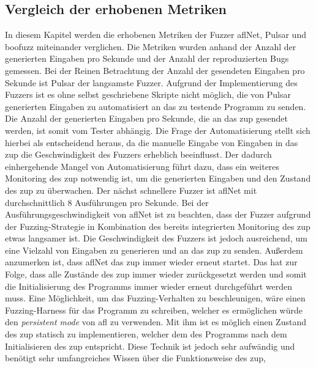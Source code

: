 \subsection{Vergleich der erhobenen Metriken}\label{subsec:vergleich-der-erhobenen-metriken}
In diesem Kapitel werden die erhobenen Metriken der Fuzzer \gls{afl}Net, Pulsar und boofuzz miteinander verglichen.
Die Metriken wurden anhand der Anzahl der generierten Eingaben pro Sekunde und der Anzahl der reproduzierten Bugs gemessen.\newline\newline
Bei der Reinen Betrachtung der Anzahl der gesendeten Eingaben pro Sekunde ist Pulsar der langsamste Fuzzer.
Aufgrund der Implementierung des Fuzzers ist es ohne selbst geschriebene Skripte nicht möglich, die von Pulsar generierten
Eingaben zu automatisiert an das zu testende Programm zu senden.
Die Anzahl der generierten Eingaben pro Sekunde, die an das \gls{zup} gesendet werden, ist somit vom Tester abhängig.
Die Frage der Automatisierung stellt sich hierbei als entscheidend heraus, da die manuelle Eingabe von Eingaben in das
\gls{zup} die Geschwindigkeit des Fuzzers erheblich beeinflusst.
Der dadurch einhergehende Mangel von Automatisierung führt dazu, dass ein weiteres Monitoring des \gls{zup} notwendig ist,
um die generierten Eingaben und den Zustand des \gls{zup} zu überwachen.\newline
Der nächst schnellere Fuzzer ist \gls{afl}Net mit durchschnittlich 8 Ausführungen pro Sekunde.
Bei der Ausführungsgeschwindigkeit von \gls{afl}Net ist zu beachten, dass der Fuzzer aufgrund der Fuzzing-Strategie
in Kombination des bereits integrierten Monitoring des \gls{zup} etwas langsamer ist.
Die Geschwindigkeit des Fuzzers ist jedoch ausreichend, um eine Vielzahl von Eingaben zu generieren und an das \gls{zup}
zu senden.
Außerdem anzumerken ist, dass \gls{afl}Net das \gls{zup} immer wieder erneut startet.
Das hat zur Folge, dass alle Zustände des \gls{zup} immer wieder zurückgesetzt werden und somit die Initialisierung des
Programms immer wieder erneut durchgeführt werden muss.
Eine Möglichkeit, um das Fuzzing-Verhalten zu beschleunigen, wäre einen Fuzzing-Harness für das Programm zu schreiben, welcher es
ermöglichen würde den \textit{persistent mode} von \gls{afl} zu verwenden.
Mit ihm ist es möglich einen Zustand des \gls{zup} statisch zu implementieren, welcher dem des Programms nach dem
Initialisieren des \gls{zup} entspricht.
Diese Technik ist jedoch sehr aufwändig und benötigt sehr umfangreiches Wissen über die Funktionsweise des \gls{zup},
